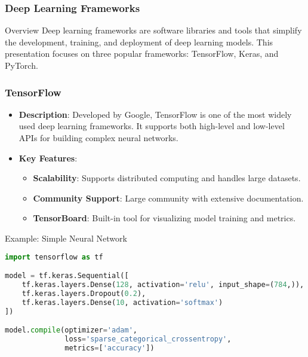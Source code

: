 \documentclass[aspectratio=169]{beamer}
\begin{document}
\begin{frame}
    \frametitle{Deep Learning Frameworks}
    \begin{block}{Overview}
        Deep learning frameworks are software libraries and tools that simplify the development, training, and deployment of deep learning models. This presentation focuses on three popular frameworks: TensorFlow, Keras, and PyTorch.
    \end{block}
\end{frame}

\begin{frame}[fragile]
    \frametitle{TensorFlow}
    \begin{itemize}
        \item \textbf{Description}: Developed by Google, TensorFlow is one of the most widely used deep learning frameworks. It supports both high-level and low-level APIs for building complex neural networks.
        \item \textbf{Key Features}:
            \begin{itemize}
                \item \textbf{Scalability}: Supports distributed computing and handles large datasets.
                \item \textbf{Community Support}: Large community with extensive documentation.
                \item \textbf{TensorBoard}: Built-in tool for visualizing model training and metrics.
            \end{itemize}
    \end{itemize}
    
    \begin{block}{Example: Simple Neural Network}
        \begin{lstlisting}[language=Python]
import tensorflow as tf

model = tf.keras.Sequential([
    tf.keras.layers.Dense(128, activation='relu', input_shape=(784,)),
    tf.keras.layers.Dropout(0.2),
    tf.keras.layers.Dense(10, activation='softmax')
])

model.compile(optimizer='adam',
              loss='sparse_categorical_crossentropy',
              metrics=['accuracy'])
        \end{lstlisting}
    \end{block}
\end{frame}
\end{document}
